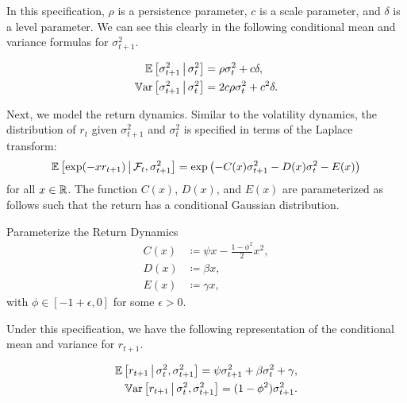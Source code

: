 In this specification, $\rho$ is a persistence parameter, $c$ is a scale parameter, and $\delta$ is a level parameter. We can see this clearly in the following conditional mean and variance formulas for $\sigma^2_{t+1}$.

\begin{remark} 
 \label{remark:vol_moment_conditions}
    \begin{align}
        \E\left[\sigma^2_{t+1} \mvert \sigma^2_t \right] &= \rho \sigma^2_t + c \delta,\\
%   
        \Var\left[\sigma^2_{t+1} \mvert \sigma^2_t \right] &= 2 c \rho \sigma^2_t + c^2 \delta.
%   
    \end{align}
\end{remark}

Next, we model the return dynamics. Similar to the volatility dynamics, the distribution of $r_t$ given $\sigma^2_{t+1}$ and $\sigma^2_{t}$ is specified in terms of the Laplace transform:
%
\begin{equation}
    \label{eqn:return_laplace_transform}
    \operatorname{\mathbb{E}}\left[\exp(- x r_{t+1}) \,\middle\vert\, \mathcal{F}_{t}, \sigma^2_{t+1} \right] = \exp\left(- C(x) \sigma^2_{t+1} - D(x) \sigma^2_t - E(x)\right)
\end{equation}
%
for all $x \in \mathbb{R}$. The function $C(x)$, $D(x)$, and $E(x)$ are parameterized as follows such that the return has a conditional Gaussian distribution.

\begin{definition}{Parameterize the Return Dynamics}
    \label{defn:physical_return_dynamics}
    \begin{align}
        C(x) &\coloneqq \psi x - \frac{1 - \phi^2}{2} x^2,\\
        D(x) &\coloneqq \beta x, \\
        E(x) &\coloneqq \gamma x,
    \end{align}
with $\phi \in [-1+\epsilon, 0]$ for some $\epsilon>0$.
\end{definition}

Under this specification, we have the following representation of the conditional mean and variance for $r_{t+1}$.

\begin{remark} 
	\label{remark:return_moment_conditions}
	\begin{align}
		\label{eqn:rtn_cond_mean}
		\operatorname{\mathbb{E}}\left[r_{t+1} \,\middle\vert\, \sigma^2_t, \sigma^2_{t+1}\right] = \psi \sigma^2_{t+1} + \beta \sigma^2_t + \gamma, \\
		\label{eqn:rtn_cond_vol}
		\operatorname{\mathbb{V}ar}\left[r_{t+1} \,\middle\vert\, \sigma^2_t, \sigma^2_{t+1}\right] = (1 - \phi^2) \sigma^2_{t+1}.
	\end{align}
\end{remark}


